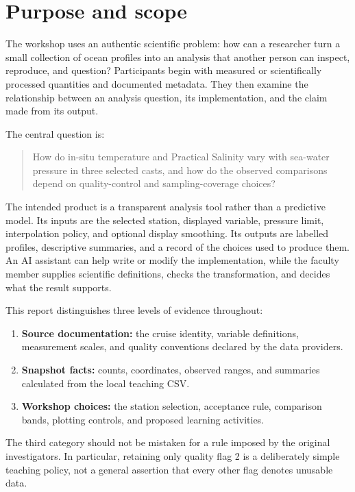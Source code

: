 \documentclass[11pt,letterpaper]{article}
\begin{document}
\clearpage
\tableofcontents
\clearpage

\section{Purpose and scope}
\label{sec:purpose}

The workshop uses an authentic scientific problem: how can a researcher turn a small collection of ocean profiles into an analysis that another person can inspect, reproduce, and question? Participants begin with measured or scientifically processed quantities and documented metadata. They then examine the relationship between an analysis question, its implementation, and the claim made from its output.

The central question is:
\begin{quote}
How do in-situ temperature and Practical Salinity vary with sea-water pressure in three selected casts, and how do the observed comparisons depend on quality-control and sampling-coverage choices?
\end{quote}

The intended product is a transparent analysis tool rather than a predictive model. Its inputs are the selected station, displayed variable, pressure limit, interpolation policy, and optional display smoothing. Its outputs are labelled profiles, descriptive summaries, and a record of the choices used to produce them. An AI assistant can help write or modify the implementation, while the faculty member supplies scientific definitions, checks the transformation, and decides what the result supports.

This report distinguishes three levels of evidence throughout:
\begin{enumerate}
  \item \textbf{Source documentation:} the cruise identity, variable definitions, measurement scales, and quality conventions declared by the data providers.
  \item \textbf{Snapshot facts:} counts, coordinates, observed ranges, and summaries calculated from the local teaching CSV.
  \item \textbf{Workshop choices:} the station selection, acceptance rule, comparison bands, plotting controls, and proposed learning activities.
\end{enumerate}
The third category should not be mistaken for a rule imposed by the original investigators. In particular, retaining only quality flag 2 is a deliberately simple teaching policy, not a general assertion that every other flag denotes unusable data.
\end{document}
